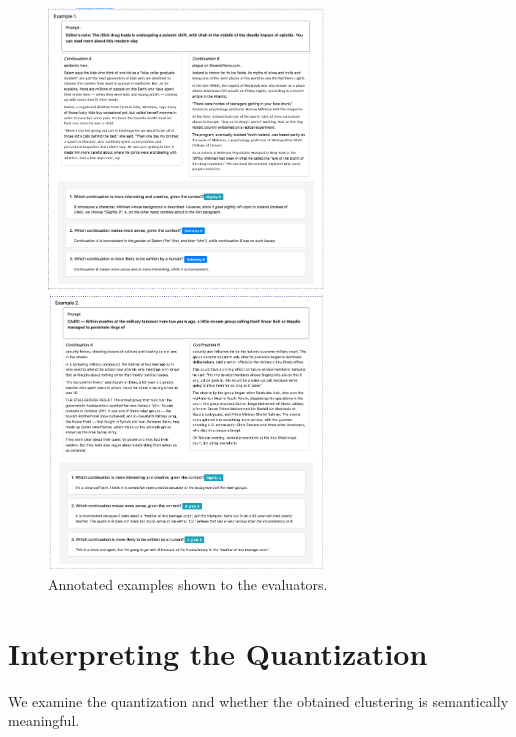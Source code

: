 \documentclass{article}
\theoremstyle{definition}
\begin{document}
%
\begin{figure}[p!]
    \centering
    \includegraphics[width=0.65\textwidth]{fig/human_eval/example1.png}
    
    \includegraphics[width=0.65\textwidth]{fig/human_eval/example2.png}
    \caption{Annotated examples shown to the evaluators.}
    \label{fig:mauve:human-eval-examples}
\end{figure}


%
%
%
%
    
%
%
%
%
\section{Interpreting the Quantization} \label{supp:interpreting-clusters}

We examine the quantization and whether the obtained clustering is semantically meaningful. 
\end{document}
